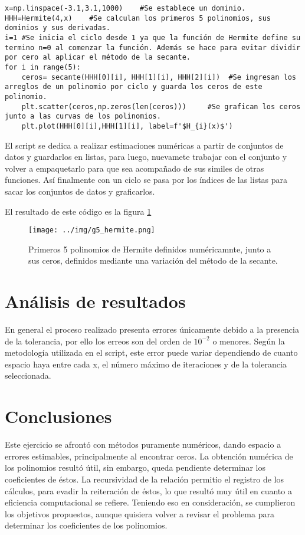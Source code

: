 \documentclass[../portafolio.tex]{subfiles}
\begin{document}
\begin{verbatim}
x=np.linspace(-3.1,3.1,1000)    #Se establece un dominio.
HHH=Hermite(4,x)    #Se calculan los primeros 5 polinomios, sus dominios y sus derivadas.
i=1 #Se inicia el ciclo desde 1 ya que la función de Hermite define su termino n=0 al comenzar la función. Además se hace para evitar dividir por cero al aplicar el método de la secante.
for i in range(5):
    ceros= secante(HHH[0][i], HHH[1][i], HHH[2][i])  #Se ingresan los arreglos de un polinomio por ciclo y guarda los ceros de este polinomio.
    plt.scatter(ceros,np.zeros(len(ceros)))     #Se grafican los ceros junto a las curvas de los polinomios.
    plt.plot(HHH[0][i],HHH[1][i], label=f'$H_{i}(x)$')
\end{verbatim}
El script se dedica a realizar estimaciones numéricas a partir de conjuntos de datos y guardarlos en listas, para luego, nuevamete trabajar con el conjunto y volver a empaquetarlo para que sea acompañado de sus similes de otras funciones. Así finalmente con un ciclo se pasa por los índices de las listas para sacar los conjuntos de datos y graficarlos. 

El resultado de este código es la figura \ref{g5_ej4_graf}

\begin{figure}
\centering
\texttt{[image: ../img/g5\_hermite.png]}
\caption{Primeros 5 polinomios de Hermite definidos numéricamnte, junto a sus ceros, definidos mediante una variación del método de la secante.} \label{g5_ej4_graf}
\end{figure}
\section{Análisis de resultados}
En general el proceso realizado presenta errores únicamente debido a la presencia de la tolerancia, por ello los erreos son del orden de $10^{-2}$ o menores. Según la metodología utilizada en el script, este error puede variar dependiendo de cuanto espacio haya entre cada x, el número máximo de iteraciones y de la tolerancia seleccionada.
\section*{Conclusiones}
Este ejercicio se afrontó con métodos puramente numéricos, dando espacio a errores estimables, principalmente al encontrar ceros. La obtención numérica de los polinomios resultó útil, sin embargo, queda pendiente determinar los coeficientes de éstos. La recursividad de la relación permitio el registro de los cálculos, para evadir la reiteración de éstos, lo que resultó muy útil en cuanto a eficiencia computacional se refiere. 
Teniendo eso en consideración, se cumplieron los objetivos propuestos, aunque quisiera volver a revisar el problema para determinar los coeficientes de los polinomios.
\end{document}
